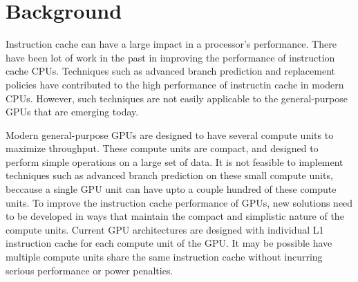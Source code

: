 \section{Background}

Instruction cache can have a large impact in a processor's performance. There have been lot of work in the past in improving the performance of instruction cache  CPUs. Techniques such as advanced branch prediction\cite{yeh93} and replacement policies\cite{smith85} have contributed to the high performance of instructin cache in modern CPUs. However, such techniques are not easily applicable to the general-purpose GPUs that are emerging today. 


Modern general-purpose GPUs are designed to have several compute units to maximize throughput. These compute units are compact, and designed to perform simple operations on a large set of data. It is not feasible to implement techniques such as advanced branch prediction on these small compute units, beccause a single GPU unit can have upto a couple hundred of these compute units. To improve the instruction cache performance of GPUs, new solutions need to be developed in ways that maintain the compact and simplistic nature of the compute units. Current GPU architectures are designed with individual L1 instruction cache for each compute unit of the GPU\cite{keckler2011}. It may be possible have multiple compute units share the same instruction cache without incurring serious performance or power penalties.
